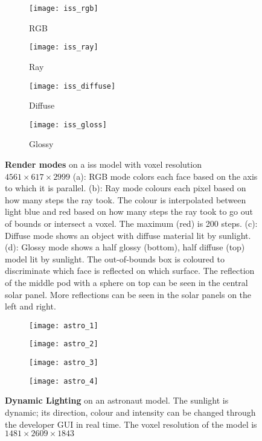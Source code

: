 \begin{figure}[H]
  \centering
  \begin{subfigure}[b]{0.48\textwidth}
    \texttt{[image: iss\_rgb]}
    \caption{RGB}
  \end{subfigure}
  \hfill
  \begin{subfigure}[b]{0.48\textwidth}
    \texttt{[image: iss\_ray]}
    \caption{Ray}
  \end{subfigure}
  \begin{subfigure}[b]{0.48\textwidth}
    \texttt{[image: iss\_diffuse]}
    \caption{Diffuse}
  \end{subfigure}
  \hfill
  \begin{subfigure}[b]{0.48\textwidth}
    \texttt{[image: iss\_gloss]}
    \caption{Glossy}
  \end{subfigure}
  \caption[ISS model with render modes]{\textbf{Render modes} on a \acrshort{iss} model with voxel resolution $4561\times617\times2999$
    (a): RGB mode colors each face based on the axis to which it is parallel.
    (b): Ray mode colours each pixel based on how many steps the ray took. The colour is interpolated between light blue and red based on how many steps the ray took to go out of bounds or intersect a voxel. The maximum (red) is 200 steps.
    (c): Diffuse mode shows an object with diffuse material lit by sunlight.
    (d): Glossy mode shows a half glossy (bottom), half diffuse (top) model lit by sunlight. The out-of-bounds box is coloured to discriminate which face is reflected on which surface. The reflection of the middle pod with a sphere on top can be seen in the central solar panel. More reflections can be seen in the solar panels on the left and right.
  }
  \label{rendermods}
\end{figure}


\begin{figure}[H]
  \centering
  \begin{subfigure}[b]{0.48\textwidth}
    \texttt{[image: astro\_1]}
  \end{subfigure}
  \hfill
  \begin{subfigure}[b]{0.48\textwidth}
    \texttt{[image: astro\_2]}
  \end{subfigure}
  \begin{subfigure}[b]{0.48\textwidth}
    \texttt{[image: astro\_3]}
  \end{subfigure}
  \hfill
  \begin{subfigure}[b]{0.48\textwidth}
    \texttt{[image: astro\_4]}
  \end{subfigure}
  \caption[Astronaut model with dynamic lighting]{\textbf{Dynamic Lighting} on an astronaut model. The sunlight is dynamic; its direction, colour and intensity can be changed through the developer GUI in real time. The voxel resolution of the model is $1481\times2609\times1843$}
\end{figure}

